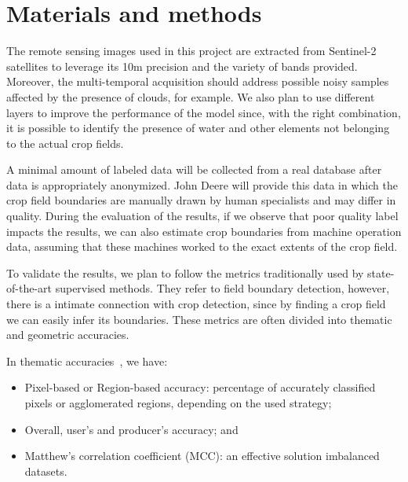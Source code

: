 \documentclass[12pt]{article}
\begin{document}
\section{Materials and methods}\label{section:materiais}

The remote sensing images used in this project are extracted from Sentinel-2 satellites to leverage its 10m precision and the variety of bands provided. Moreover, the multi-temporal acquisition should address possible noisy samples affected by the presence of clouds, for example. We also plan to use different layers to improve the performance of the model since, with the right combination, it is possible to identify the presence of water and other elements not belonging to the actual crop fields.

A minimal amount of labeled data will be collected from a real database after data is appropriately anonymized. John Deere will provide this data in which the crop field boundaries are manually drawn by human specialists and may differ in quality. During the evaluation of the results, if we observe that poor quality label impacts the results, we can also estimate crop boundaries from machine operation data, assuming that these machines worked to the exact extents of the crop field.



To validate the results, we plan to follow the metrics traditionally used by state-of-the-art supervised methods. They refer to field boundary detection, however, there is a intimate connection with crop detection, since by finding a crop field we can easily infer its boundaries. These metrics are often divided into thematic and geometric accuracies.

In thematic accuracies~\citep{lizarazo2014}, we have:
\begin{itemize}
    \item Pixel-based or Region-based accuracy: percentage of accurately classified pixels or agglomerated regions, depending on the used strategy;
    \item Overall, user's and producer's accuracy; and
    \item Matthew's correlation coefficient (MCC): an effective solution  imbalanced datasets.
\end{itemize}
\end{document}
